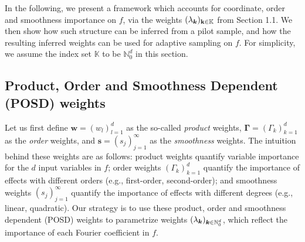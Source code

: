 \documentclass[USenglish]{article}
\theoremstyle{dgthm}
\theoremstyle{dgthm}
\theoremstyle{dgthm}
\theoremstyle{dgthm}
\theoremstyle{dgdef}
\begin{document}
In the following, we present a framework which accounts for coordinate, order and smoothness importance on $f$, via the weights $(\lambda_{\boldsymbol{k}})_{\mathbf{k} \in \mathbb{K}}$ from Section 1.1. We then show how such structure can be inferred from a pilot sample, and how the resulting inferred weights can be used for adaptive sampling on $f$. For simplicity, we assume the index set $\mathbb{K}$ to be $\mathbb{N}_0^d$ in this section.


\subsection{Product, Order and Smoothness Dependent (POSD) weights}
Let us first define $\mathbf{w} = (w_l)_{l=1}^d$ as the so-called \textit{product} weights, $\boldsymbol{\Gamma} = (\Gamma_k)_{k=1}^d$ as the \textit{order} weights, and $\mathbf{s} = (s_j)_{j=1}^\infty$ as the \textit{smoothness} weights. The intuition behind these weights are as follows: product weights quantify variable importance for the $d$ input variables in $f$; order weights $(\Gamma_k)_{k=1}^d$ quantify the importance of effects with different orders (e.g., first-order, second-order); and smoothness weights $(s_j)_{j=1}^\infty$ quantify the importance of effects with different degrees (e.g., linear, quadratic). Our strategy is to use these product, order and smoothness dependent (POSD) weights to parametrize weights $(\lambda_{{\boldsymbol{k}}})_{{\boldsymbol{k}} \in \mathbb{N}_0^d}$, which reflect the importance of each Fourier coefficient in $f$.
\end{document}
